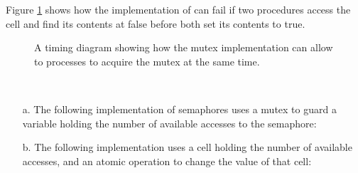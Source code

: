 \begin{exe}[3.46]
    Figure \ref{3.46fig} shows how the implementation of  
    can fail if two procedures access the cell and find its contents at false 
    before both set its contents to true.
    \begin{figure}
        \centering
        \caption{A timing diagram showing how the mutex implementation can allow 
        to processes to acquire the mutex at the same time.}
        \label{3.46fig}
    \end{figure}
\end{exe}

\begin{exe}[3.47]
    \ \vspace{-20pt}
    \begin{itemize}
        \item[a.] The following implementation of semaphores uses a mutex to 
            guard a variable holding the number of available accesses to the 
            semaphore:
        \item[b.] The following implementation uses a cell holding the number of 
            available accesses, and an atomic  operation to 
            change the value of that cell:
    \end{itemize}
\end{exe}

